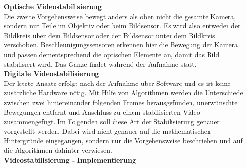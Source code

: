 \documentclass[conference]{IEEEtran}
\begin{document}
	\textbf{Optische Videostabilisierung}\\
	Die zweite Vorgehensweise bewegt anders als oben nicht die gesamte Kamera, sondern nur Teile im Objektiv oder beim Bildsensor. Es wird also entweder der Bildkreis über dem Bildsensor oder der Bildsensor unter dem Bildkreis verschoben. Beschleunigungssensoren erkennen hier die Bewegung der Kamera und passen dementsprechend die optischen Elemente an, damit das Bild stabilisiert wird. Das Ganze findet während der Aufnahme statt.\\
	\textbf{Digitale Videostabilisierung}\\
	Der letzte Ansatz erfolgt nach der Aufnahme über Software und es ist keine zusätzliche Hardware nötig. Mit Hilfe von Algorithmen werden die Unterschiede zwischen zwei hintereinander folgenden Frames herausgefunden, unerwünschte Bewegungen entfernt und Anschluss zu einem stabilisierten Video zusammengefügt. Im Folgenden soll diese Art der Stabilisierung genauer vorgestellt werden.
	Dabei wird nicht genauer auf die mathematischen Hintergründe eingegangen, sondern nur die Vorgehensweise beschrieben und auf die Algorithmen dahinter verwiesen.\\
	\textbf{Videostabilisierung - Implementierung}\\
\end{document}
